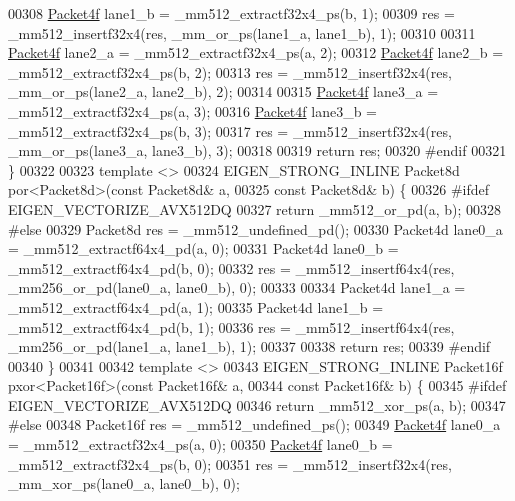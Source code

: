 \begin{DoxyCode}
00308   \hyperlink{struct_eigen_1_1internal_1_1_packet4f}{Packet4f} lane1\_b = \_mm512\_extractf32x4\_ps(b, 1);
00309   res = \_mm512\_insertf32x4(res, \_mm\_or\_ps(lane1\_a, lane1\_b), 1);
00310 
00311   \hyperlink{struct_eigen_1_1internal_1_1_packet4f}{Packet4f} lane2\_a = \_mm512\_extractf32x4\_ps(a, 2);
00312   \hyperlink{struct_eigen_1_1internal_1_1_packet4f}{Packet4f} lane2\_b = \_mm512\_extractf32x4\_ps(b, 2);
00313   res = \_mm512\_insertf32x4(res, \_mm\_or\_ps(lane2\_a, lane2\_b), 2);
00314 
00315   \hyperlink{struct_eigen_1_1internal_1_1_packet4f}{Packet4f} lane3\_a = \_mm512\_extractf32x4\_ps(a, 3);
00316   \hyperlink{struct_eigen_1_1internal_1_1_packet4f}{Packet4f} lane3\_b = \_mm512\_extractf32x4\_ps(b, 3);
00317   res = \_mm512\_insertf32x4(res, \_mm\_or\_ps(lane3\_a, lane3\_b), 3);
00318 
00319   \textcolor{keywordflow}{return} res;
00320 \textcolor{preprocessor}{#endif}
00321 \}
00322 
00323 \textcolor{keyword}{template} <>
00324 EIGEN\_STRONG\_INLINE Packet8d por<Packet8d>(\textcolor{keyword}{const} Packet8d& a,
00325                                            \textcolor{keyword}{const} Packet8d& b) \{
00326 \textcolor{preprocessor}{#ifdef EIGEN\_VECTORIZE\_AVX512DQ}
00327   \textcolor{keywordflow}{return} \_mm512\_or\_pd(a, b);
00328 \textcolor{preprocessor}{#else}
00329   Packet8d res = \_mm512\_undefined\_pd();
00330   Packet4d lane0\_a = \_mm512\_extractf64x4\_pd(a, 0);
00331   Packet4d lane0\_b = \_mm512\_extractf64x4\_pd(b, 0);
00332   res = \_mm512\_insertf64x4(res, \_mm256\_or\_pd(lane0\_a, lane0\_b), 0);
00333 
00334   Packet4d lane1\_a = \_mm512\_extractf64x4\_pd(a, 1);
00335   Packet4d lane1\_b = \_mm512\_extractf64x4\_pd(b, 1);
00336   res = \_mm512\_insertf64x4(res, \_mm256\_or\_pd(lane1\_a, lane1\_b), 1);
00337 
00338   \textcolor{keywordflow}{return} res;
00339 \textcolor{preprocessor}{#endif}
00340 \}
00341 
00342 \textcolor{keyword}{template} <>
00343 EIGEN\_STRONG\_INLINE Packet16f pxor<Packet16f>(\textcolor{keyword}{const} Packet16f& a,
00344                                               \textcolor{keyword}{const} Packet16f& b) \{
00345 \textcolor{preprocessor}{#ifdef EIGEN\_VECTORIZE\_AVX512DQ}
00346   \textcolor{keywordflow}{return} \_mm512\_xor\_ps(a, b);
00347 \textcolor{preprocessor}{#else}
00348   Packet16f res = \_mm512\_undefined\_ps();
00349   \hyperlink{struct_eigen_1_1internal_1_1_packet4f}{Packet4f} lane0\_a = \_mm512\_extractf32x4\_ps(a, 0);
00350   \hyperlink{struct_eigen_1_1internal_1_1_packet4f}{Packet4f} lane0\_b = \_mm512\_extractf32x4\_ps(b, 0);
00351   res = \_mm512\_insertf32x4(res, \_mm\_xor\_ps(lane0\_a, lane0\_b), 0);

\end{DoxyCode}
